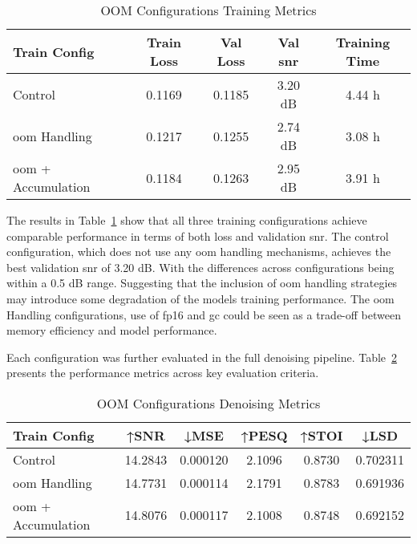 \vspace{1em}
\begin{table}[H]
\centering
\caption{OOM Configurations Training Metrics}
\label{tab:oom_training}
\begin{tabular}{|l|c|c|c|c|}
\hline
\textbf{Train Config} & \textbf{Train Loss} & \textbf{Val Loss} & \textbf{Val \gls{snr}} & \textbf{Training Time} \\
\hline
Control                & 0.1169 & 0.1185 & 3.20 dB & 4.44 h \\
\gls{oom} Handling           & 0.1217 & 0.1255 & 2.74 dB & 3.08 h \\
\gls{oom} + Accumulation     & 0.1184 & 0.1263 & 2.95 dB & 3.91 h \\
\hline
\end{tabular}
\end{table}

The results in Table~\ref{tab:oom_training} show that all three training configurations achieve comparable performance in terms of both loss and validation \gls{snr}. The control configuration, which does not use any \gls{oom} handling mechanisms, achieves the best validation \gls{snr} of 3.20 dB. With the differences across configurations being within a 0.5 dB range. Suggesting that the inclusion of \gls{oom} handling strategies may introduce some degradation of the models training performance. The \gls{oom} Handling configurations, use of \gls{fp16} and \gls{gc} could be seen as a trade-off between memory efficiency and model performance. 

Each configuration was further evaluated in the full denoising pipeline. Table~\ref{tab:oom_metrics} presents the performance metrics across key evaluation criteria.

\vspace{1em}
\begin{table}[H]
\centering
\caption{OOM Configurations Denoising Metrics}
\label{tab:oom_metrics}
\begin{tabular}{|l|c|c|c|c|c|}
\hline
\textbf{Train Config} & \textbf{↑SNR} & \textbf{↓MSE} & \textbf{↑PESQ} & \textbf{↑STOI} & \textbf{↓LSD} \\
\hline
Control              &  14.2843 & 0.000120 & 2.1096 & 0.8730 & 0.702311 \\
\gls{oom} Handling           & 14.7731 & 0.000114 & 2.1791 & 0.8783 & 0.691936 \\
\gls{oom} + Accumulation     & 14.8076 & 0.000117 & 2.1008 & 0.8748 & 0.692152 \\
\hline
\end{tabular}
\end{table}

